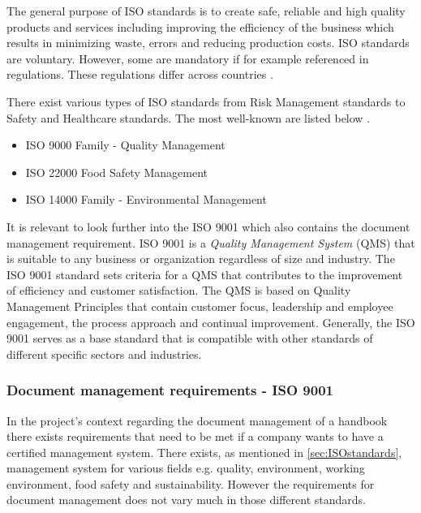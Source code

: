 The general purpose of ISO standards is to create safe, reliable and high quality products and services including improving the efficiency of the business which results in minimizing waste, errors and reducing production costs\cite{ISOinfo}. %
ISO standards are voluntary.
However, some are mandatory if for example referenced in regulations.
These regulations differ across countries \cite{ISOreviewedevery5years}.

There exist various types of ISO standards from Risk Management standards to Safety and Healthcare standards. The most well-known are listed below \citep{ISOmostpopularlist}.

\begin{itemize}
	\item ISO 9000 Family - Quality Management
	\item ISO 22000 Food Safety Management
	\item ISO 14000 Family - Environmental Management
\end{itemize}

It is relevant to look further into the ISO 9001 which also contains the document management requirement.
ISO 9001 is a \textit{Quality Management System} (QMS) that is suitable to any business or organization regardless of size and industry\cite{ISO9001}.
The ISO 9001 standard sets criteria for a QMS that contributes to the improvement of efficiency and customer satisfaction.
The QMS is based on Quality Management Principles that contain customer focus, leadership and employee engagement, the process approach and continual improvement\cite{ISO9001-2}.
Generally, the ISO 9001 serves as a base standard that is compatible with other standards of different specific sectors and industries.

\subsubsection{Document management requirements - ISO 9001} \label{sec:DMR}
In the project's context regarding the document management of a handbook there exists requirements that need to be met if a company wants to have a certified management system.
There exists, as mentioned in \cref{sec:ISOstandards}, management system for various fields e.g. quality, environment, working environment, food safety and sustainability.
However the requirements for document management does not vary much in those different standards.

